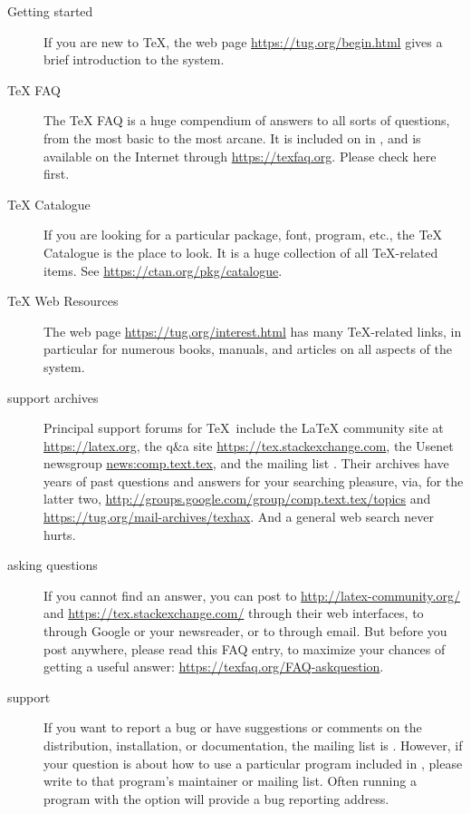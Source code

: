 \documentclass{article}
\begin{document}
\begin{description}
\item [Getting started] If you are new to \TeX, the web page
\url{https://tug.org/begin.html} gives a brief introduction to the system.

\item [\TeX{} FAQ] The \TeX{} FAQ is a huge compendium
  of answers to all sorts of questions, from the most basic to the
  most arcane.  It is included on \TL{} in
  , and is available
  on the Internet through \url{https://texfaq.org}.  Please
  check here first.

\item [\TeX{} Catalogue] If you are looking for a particular package,
font, program, etc., the \TeX{} Catalogue is the place to look.  It is a
huge collection of all \TeX{}-related items.  See
\url{https://ctan.org/pkg/catalogue}.

\item [\TeX{} Web Resources] The web page
\url{https://tug.org/interest.html} has many \TeX{}-related links, in
particular for numerous books, manuals, and articles on all aspects of
the system.

\item [support archives] Principal support forums for \TeX\ include
the \LaTeX{} community site at \url{https://latex.org}, the
q\&a site \url{https://tex.stackexchange.com}, the Usenet newsgroup
\url{news:comp.text.tex}, and the mailing list .
Their archives have years of past questions and answers for your
searching pleasure, via, for the latter two,
\url{http://groups.google.com/group/comp.text.tex/topics} and
\url{https://tug.org/mail-archives/texhax}.  And a general web search
never hurts.

\item [asking questions] If you cannot find an answer, you can post to 
\url{http://latex-community.org/} and
\url{https://tex.stackexchange.com/} through their web interfaces, to
 through Google or your newsreader, or to
 through email.  But before you post anywhere,
please read this FAQ entry, to maximize your chances of getting a useful
answer:
\url{https://texfaq.org/FAQ-askquestion}.

\item [\TL{} support] If you want to report a bug or have
suggestions or comments on the \TL{} distribution, installation, or
documentation, the mailing list is .  However,
if your question is about how to use a particular program included in
\TL{}, please write to that program's maintainer or
mailing list.  Often running a program with the  option
will provide a bug reporting address.

\end{description}
\end{document}
